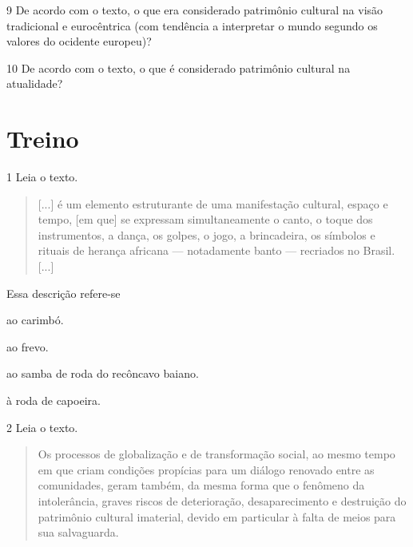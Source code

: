 \num{9} De acordo com o texto, o que era considerado patrimônio cultural na
  visão tradicional e eurocêntrica (com tendência a interpretar o mundo
  segundo os valores do ocidente europeu)?


\pagebreak
\num{10} De acordo com o texto, o que é considerado patrimônio cultural na
  atualidade?


\section{Treino}

\num{1} Leia o texto.

\begin{quote}
{[}...{]} é um elemento estruturante de uma manifestação cultural, espaço e tempo, 
[em que] se expressam simultaneamente o canto, o toque dos instrumentos, a dança, 
os golpes, o jogo, a brincadeira, os símbolos e rituais de herança africana 
--- notadamente banto --- recriados no Brasil. {[}...{]}

\end{quote}
  
Essa descrição refere-se

\begin{escolha}
\item ao carimbó.
\item ao frevo.
\item ao samba de roda do recôncavo baiano.
\item à roda de capoeira.
\end{escolha}

\num{2} Leia o texto.

\begin{quote}
Os processos de globalização e de transformação social, ao mesmo tempo
em que criam condições propícias para um diálogo renovado entre as
comunidades, geram também, da mesma forma que o fenômeno da
intolerância, graves riscos de deterioração, desaparecimento e
destruição do patrimônio cultural imaterial, devido em particular à
falta de meios para sua salvaguarda.

\end{quote}

